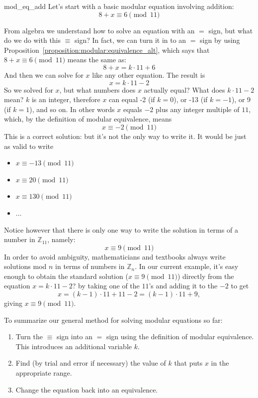 \begin{example}{mod_eq_add}
Let's start with a basic modular equation involving addition: 
\[
8 + x \equiv 6 \pmod{11}
\]

From algebra we understand how to solve an equation with an $=$ sign, but what do we do with this $ \equiv $ sign?  In fact, we can turn it in to an $=$ sign by using Proposition~\ref{proposition:modular:equivalence_alt}, which says that $8 + x \equiv 6 \pmod{11}$ means the same as:
\[
8 + x = k \cdot 11 + 6
\]
And then we can solve for $x$ like any other equation.  The result is
\[
x = k \cdot 11 - 2
\]
So we solved for $x$, but  what numbers does $x$ actually equal?  What does $k \cdot 11 - 2$ mean?  $k$ is an integer, therefore $x$ can equal -2 (if $k = 0$), or -13 (if $k = -1$), or 9 (if $k = 1$), and so on.  In other words $x$ equals $-2$ plus any integer multiple of $11$, which, by the definition of modular equivalence, means
\[
x \equiv -2 \pmod{11}
\]
This is a correct solution: but it's not the only way to write it. It would be just as valid to write
\begin{itemize}
\item
$x \equiv -13 \pmod{11}$
\item
$x \equiv  20 \pmod{11}$
\item
$x \equiv  130 \pmod{11}$
\item
$\ldots$
\end{itemize}
Notice however that there is only one way to write the solution in terms of a number in ${\mathbb Z}_{11}$, namely:
\[
x \equiv 9 \pmod{11}
\]
In order to avoid ambiguity, mathematicians and textbooks always write solutions mod $n$ in terms of numbers in ${\mathbb Z}_n$. 
In our current example, it's easy enough to obtain the standard solution ($x \equiv 9 \pmod{11}$)  directly from the equation $x = k \cdot 11 - 2$? by taking
one of the $11$'s and adding it to the $-2$ to get
\[
x = (k-1) \cdot 11 + 11 - 2 = (k-1) \cdot 11 + 9,
\]
giving  $x \equiv 9 \pmod{11}$.

\end{example}

\medskip

\noindent
To summarize our general method for solving modular equations so far:

\begin{enumerate}
\item
Turn the $ \equiv $ sign into an $=$ sign using the definition of modular equivalence. This introduces an additional variable $k$.
\item
Find (by trial and error if necessary) the value of $k$ that puts $x$ in the appropriate range.
\item
Change the equation back into an equivalence.
\end{enumerate}


